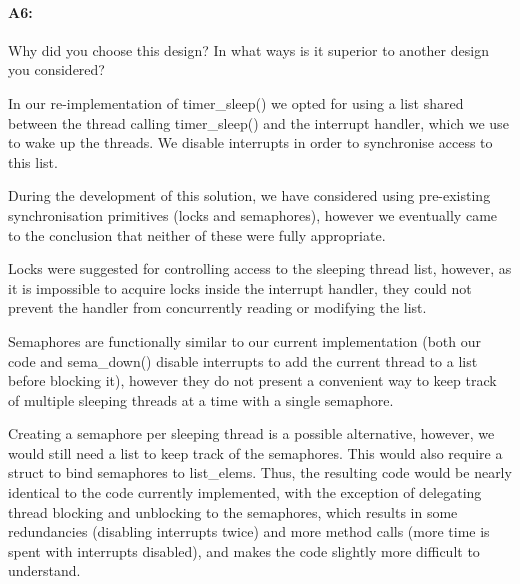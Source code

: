 \documentclass[11pt]{article}
\begin{document}
\paragraph{A6:}
Why did you choose this design? In what ways is it superior to another design
you considered?

In our re-implementation of timer\_sleep() we opted for using a list shared
between the thread calling timer\_sleep() and the interrupt handler, which we
use to wake up the threads. We disable interrupts in order to synchronise access
to this list.

During the development of this solution, we have considered using pre-existing
synchronisation primitives (locks and semaphores), however we eventually came to
the conclusion that neither of these were fully appropriate.

Locks were suggested for controlling access to the sleeping thread list,
however, as it is impossible to acquire locks inside the interrupt handler, they
could not prevent the handler from concurrently reading or modifying the list.

Semaphores are functionally similar to our current implementation (both our code
and sema\_down() disable interrupts to add the current thread to a list before
blocking it), however they do not present a convenient way to keep track of
multiple sleeping threads at a time with a single semaphore.

Creating a semaphore per sleeping thread is a possible alternative, however, we
would still need a list to keep track of the semaphores. This would also require
a struct to bind semaphores to list\_elems. Thus, the resulting code would be
nearly identical to the code currently implemented, with the exception of
delegating thread blocking and unblocking to the semaphores, which results in
some redundancies (disabling interrupts twice) and more method calls (more time
is spent with interrupts disabled), and makes the code slightly more difficult
to understand.
\end{document}
